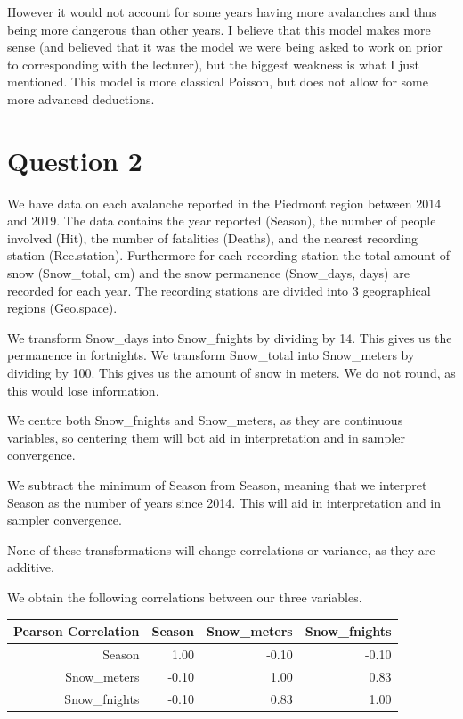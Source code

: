 \documentclass[10pt]{extarticle}
\begin{document}
However it would not account for some years having more avalanches and thus being more dangerous than other years. I believe that this model makes more sense (and believed that it was the model we were being asked to work on prior to corresponding with the lecturer), but the biggest weakness is what I just mentioned. This model is more classical Poisson, but does not allow for some more advanced deductions. 

\section*{Question 2}

We have data on each avalanche reported in the Piedmont region between 2014 and 2019. The data contains the year reported (Season), the number of people involved (Hit), the number of fatalities (Deaths), and the nearest recording station (Rec.station). Furthermore for each recording station the total amount of snow (Snow\_total, cm) and the snow permanence (Snow\_days, days) are recorded for each year. The recording stations are divided into 3 geographical regions (Geo.space). 

We transform Snow\_days into Snow\_fnights by dividing by 14. This gives us the permanence in fortnights. We transform Snow\_total into Snow\_meters by dividing by 100. This gives us the amount of snow in meters.  We do not round, as this would lose information. 

We centre both Snow\_fnights and Snow\_meters, as they are continuous variables, so centering them will bot aid in interpretation and in sampler convergence. 

We subtract the minimum of Season from Season, meaning that we interpret Season as the number of years since 2014. This will aid in interpretation and in sampler convergence. 

None of these transformations will change correlations or variance, as they are additive. 

We obtain the following correlations between our three variables. 
\begin{table}[ht]
	\centering
	\begin{tabular}{r|rrr}
	Pearson Correlation	& Season & Snow\_meters & Snow\_fnights \\ 
		\hline
		Season & 1.00 & -0.10 & -0.10 \\ 
		Snow\_meters & -0.10 & 1.00 & 0.83 \\ 
		Snow\_fnights & -0.10 & 0.83 & 1.00 \\ 
	\end{tabular}
\end{table}
\end{document}
